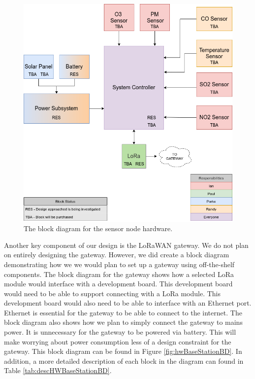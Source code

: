 \begin{figure}[H]
    \centering
    \includegraphics[width=5.3in]{"./figures/hwNodeBD.png"} 
    \caption{The block diagram for the sensor node hardware.}
    \label{fig:hwNodeBD}
\end{figure}

Another key component of our design is the LoRaWAN gateway. We do not plan on entirely designing the gateway. However, we did create a block diagram demonstrating how we we would plan to set up a gateway using off-the-shelf components. The block diagram for the gateway shows how a selected LoRa module would interface with a development board. This development board would need to be able to support connecting with a LoRa module. This development board would also need to be able to interface with an Ethernet port. Ethernet is essential for the gateway to be able to connect to the internet. The block diagram also shows how we plan to simply connect the gateway to mains power. It is unnecessary for the gateway to be powered via battery. This will make worrying about power consumption less of a design constraint for the gateway. This block diagram can be found in Figure \ref{fig:hwBaseStationBD}. In addition, a more detailed description of each block in the diagram can found in Table \ref{tab:descHWBaseStationBD}.

